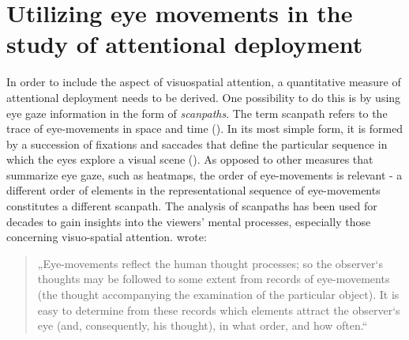 \documentclass[a4paper, 12pt]{scrreprt}
\begin{document}
\section{Utilizing eye movements in the study of attentional deployment}\label{section:eyeutils}

In order to include the aspect of visuospatial attention, a quantitative measure of attentional deployment needs to be derived. One possibility to do this is by using eye gaze information in the form of \textit{scanpaths}.
The term scanpath refers to the trace of eye-movements in space and time (\cite{holmqvist2011eye}). In its most simple form, it is formed by a succession of fixations and saccades that define the particular sequence in which the eyes explore a visual scene (\cite{anderson2015comparison}). As opposed to other measures that summarize eye gaze, such as heatmaps, the order of eye-movements is relevant - a different order of elements in the representational sequence of eye-movements constitutes a different scanpath. \newline
The analysis of scanpaths has been used for decades to gain insights into the viewers’ mental processes, especially those concerning visuo-spatial attention. \textcite{yarbus1967eye} wrote: 

\begin{quotation}
\footnotesize{„Eye-movements reflect the human thought processes; so the observer‘s thoughts may be followed to some extent from records of eye-movements (the thought accompanying the examination of the particular object). It is easy to determine from these records which elements attract the observer‘s eye (and, consequently, his thought), in what order, and how often.“}
\end{quotation}
\end{document}
